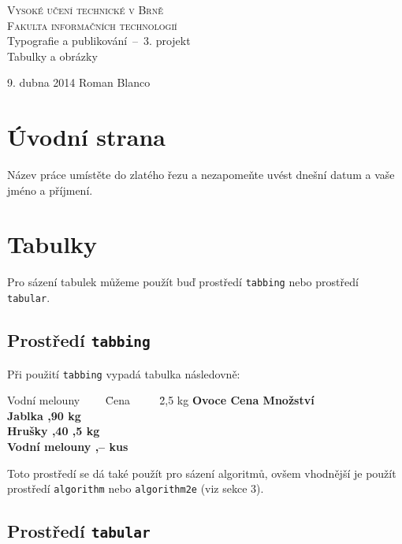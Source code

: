 \documentclass[11pt,a4paper]{article}
\begin{document}
  \begin{titlepage}
    \begin{center}
      \Huge\textsc{Vysoké učení technické v Brně} \\ 
      \huge\textsc{Fakulta informačních technologií} \\[84mm]
      \LARGE{Typografie a publikování \,--\, 3. projekt} \\
      \Huge{Tabulky a obrázky}
      \vfill
    \end{center}
    \Large{9. dubna 2014 \hfill Roman Blanco}
  \end{titlepage}
  \section{Úvodní strana}

    Název práce umístěte do zlatého řezu a nezapomeňte uvést dnešní datum a vaše jméno a příjmení.

  \section{Tabulky}

  Pro sázení tabulek můžeme použít buď prostředí \texttt{tabbing} nebo prostředí \texttt{tabular}.

    \subsection{Prostředí \texttt{tabbing}}

    Při použití \texttt{tabbing} vypadá tabulka následovně:

      \begin{tabbing}
        Vodní melouny ~~~~\= Cena ~~~~  \= 2,5 kg \kill
        \bfseries Ovoce \>
        \bfseries Cena \>
        \bfseries Množství \\
        Jablka ,90  kg \\
        Hrušky ,40 ,5 kg \\
        Vodní melouny ,--  kus
      \end{tabbing}


    Toto prostředí se dá také použít pro sázení algoritmů, ovšem vhodnější je použít prostředí \texttt{algorithm} nebo \texttt{algorithm2e} (viz sekce 3).

    \subsection{Prostředí \texttt{tabular}}
    
\end{document}
